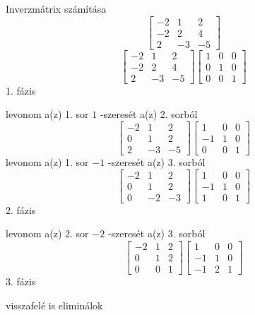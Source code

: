 \documentclass[12pt]{article}
\begin{document}
Inverzmátrix számítása
$$\left[{\begin{array}{ccc}-2& 1& 2\\ -2& 2& 4\\ 2& -3& -5\end{array}}\right]$$
$$\left[{\begin{array}{ccc}-2& 1& 2\\ -2& 2& 4\\ 2& -3& -5\end{array}}\right]\left[{\begin{array}{ccc}1& 0& 0\\ 0& 1& 0\\ 0& 0& 1\end{array}}\right]$$
1. fázis

levonom a(z) 1. sor $1$ -szeresét a(z) 2. sorból
$$\left[{\begin{array}{ccc}-2& 1& 2\\ 0& 1& 2\\ 2& -3& -5\end{array}}\right]\left[{\begin{array}{ccc}1& 0& 0\\ -1& 1& 0\\ 0& 0& 1\end{array}}\right]$$
levonom a(z) 1. sor $-1$ -szeresét a(z) 3. sorból
$$\left[{\begin{array}{ccc}-2& 1& 2\\ 0& 1& 2\\ 0& -2& -3\end{array}}\right]\left[{\begin{array}{ccc}1& 0& 0\\ -1& 1& 0\\ 1& 0& 1\end{array}}\right]$$
2. fázis

levonom a(z) 2. sor $-2$ -szeresét a(z) 3. sorból
$$\left[{\begin{array}{ccc}-2& 1& 2\\ 0& 1& 2\\ 0& 0& 1\end{array}}\right]\left[{\begin{array}{ccc}1& 0& 0\\ -1& 1& 0\\ -1& 2& 1\end{array}}\right]$$
3. fázis

visszafelé is eliminálok
\end{document}

